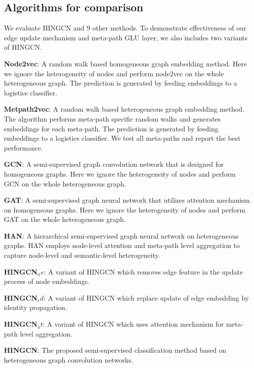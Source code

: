 \subsection{Algorithms for comparison}
\label{sec:algo-comp}
We evaluate HINGCN and 9 other methods. To demonstrate effectiveness of our edge update mechanism and meta-path GLU layer, we also includes two variants of HINGCN.

\noindent{\small$\bullet$}
\textbf{Node2vec\cite{GroverL16}}: A random walk based homogeneous graph embedding method. Here we ignore the heterogeneity of nodes and perform node2vec on the whole heterogeneous graph. The prediction is generated by feeding embeddings to a logistics classifier.

\noindent{\small$\bullet$}
\textbf{Metpath2vec\cite{DongCS17}}: A random walk based heterogeneous graph embedding method. The algorithm performs meta-path specific random walks and generates embeddings for each meta-path. The prediction is generated by feeding embeddings to a logistics classifier. We test all meta-paths and report the best performance.

\noindent{\small$\bullet$}
\textbf{GCN\cite{KipfW17}}: A semi-supervised graph convolution network that is designed for homogeneous graphs. Here we ignore the heterogeneity of nodes and perform GCN on the whole heterogeneous graph. 

\noindent{\small$\bullet$}
\textbf{GAT\cite{VelickovicCCRLB18}}: A semi-supervised graph neural network that utilizes attention mechanism on homogeneous graphs. Here we ignore the heterogeneity of nodes and perform GAT on the whole heterogeneous graph. 

\noindent{\small$\bullet$}
\textbf{HAN\cite{WangJSWYCY19}}:
A hierarchical semi-supervised graph neural network on heterogeneous graphs. HAN employs node-level attention and meta-path level aggregation to capture node-level and semantic-level heterogeneity.

\noindent{\small$\bullet$}
\textbf{HINGCN$_ne$}: 
A variant of HINGCN which removes edge feature in the update process of node embeddings.

\noindent{\small$\bullet$}
\textbf{HINGCN$_ed$}: 
A variant of HINGCN which replace update of edge embedding by identity propagation.

\noindent{\small$\bullet$}
\textbf{HINGCN$_at$}:
A variant of HINGCN which uses attention mechanism for meta-path level aggregation.

\noindent{\small$\bullet$}
\textbf{HINGCN}:
The proposed semi-supervised classification method based on heterogeneous graph convolution networks.


